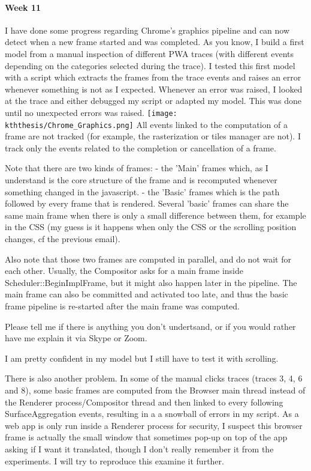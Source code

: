 \documentclass{kththesis}
\begin{document}
\paragraph{Week 11}
I have done some progress regarding Chrome's graphics pipeline and can now detect when a new frame started and was completed.
As you know, I build a first model from a manual inspection of different PWA traces (with different events depending on the categories selected during the trace). I tested this first model with a script which extracts the frames from the trace events and raises an error whenever something is not as I expected. Whenever an error was raised, I looked at the trace and either debugged my script or adapted my model. This was done until no unexpected errors was raised.
\newline
\texttt{[image: kththesis/Chrome\_Graphics.png]}
\newline
All events linked to the computation of a frame are not tracked (for example, the rasterization or tiles manager are not). I track only the events related to the completion or cancellation of a frame.

Note that there are two kinds of frames:
    - the 'Main' frames which, as I understand is the core structure of the frame and is recomputed whenever something changed in the javascript.
    - the 'Basic' frames which is the path followed by every frame that is rendered. Several 'basic' frames can share the same main frame when there is only a small difference between them, for example in the CSS (my guess is it happens when only the CSS or the scrolling position changes, cf the previous email).

Also note that those two frames are computed in parallel, and do not wait for each other. Usually, the Compositor asks for a main frame inside  Scheduler::BeginImplFrame, but it might also happen later in the pipeline. The main frame can also be committed and activated too late, and thus the basic frame pipeline is re-started after the main frame was computed.

Please tell me if there is anything you don't undertsand, or if you would rather have me explain it via Skype or Zoom.

I am pretty confident in my model but I still have to test it with scrolling.

There is also another problem. In some of the manual clicks traces (traces 3, 4, 6 and 8), some basic frames are computed from the Browser main thread instead of the Renderer process/Compositor thread and then linked to every following SurfaceAggregation events, resulting in a a snowball of errors in my script. As a web app is only run inside a Renderer process for security, I suspect this browser frame is actually the small window that sometimes pop-up on top of the app asking if I want it translated, though I don't really remember it from the experiments. I will try to reproduce this examine it further.
\end{document}
